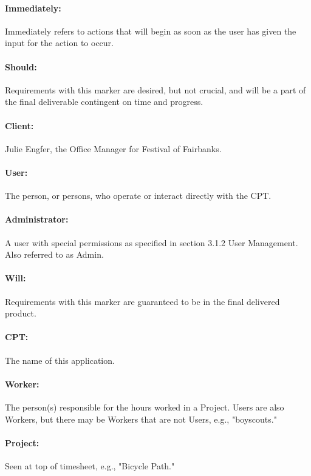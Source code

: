 \documentclass[12pt]{article}
\begin{document}
\paragraph{Immediately:} Immediately refers to actions that will begin as soon as the user has given the input for the action to occur.
\paragraph{Should:} Requirements with this marker are desired, but not crucial, and will be a part of the final deliverable contingent on time and progress.
\paragraph{Client:} Julie Engfer, the Office Manager for Festival of Fairbanks.
\paragraph{User:} The person, or persons, who operate or interact directly with the CPT.
\paragraph{Administrator:} A user with special permissions as specified in section 3.1.2 User Management. Also referred to as Admin.
\paragraph{Will:} Requirements with this marker are guaranteed to be in the final delivered product.
\paragraph{CPT:} The name of this application.
\paragraph{Worker:} The person(s) responsible for the hours worked in a Project. Users are also Workers, but there may be Workers that are not Users, e.g., "boyscouts."
\paragraph{Project:} Seen at top of timesheet, e.g., "Bicycle Path."
\end{document}
